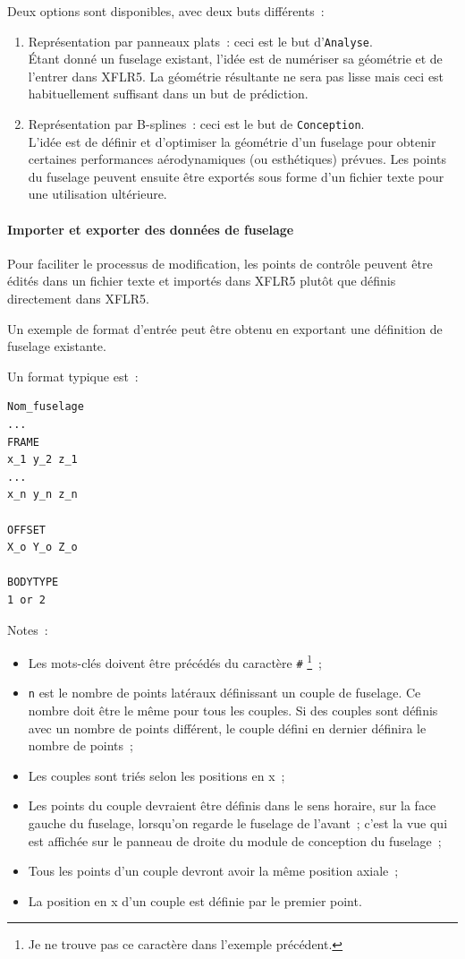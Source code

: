 \documentclass[a4paper,twoside,12pt,dvips]{article}
\begin{document}
Deux options sont disponibles, avec deux buts différents~:

\begin{enumerate}
  \item Représentation par panneaux plats~: ceci est le but 
  d’\texttt{Analyse}.\\
  Étant donné un fuselage existant, l’idée est de numériser sa géométrie et de
  l’entrer dans XFLR5. La géométrie résultante ne sera pas lisse mais ceci est
  habituellement suffisant dans un but de prédiction. 
  \item Représentation par B-splines~: ceci est le but de \texttt{Conception}.\\
  L’idée est de définir et d’optimiser la géométrie d’un fuselage pour
  obtenir certaines performances aérodynamiques (ou esthétiques) prévues. Les 
  points du fuselage peuvent ensuite être exportés sous forme d’un fichier texte
  pour une utilisation ultérieure.
\end{enumerate}

\paragraph{Importer et exporter des données de fuselage} 
Pour faciliter le processus de modification, les points de contrôle peuvent être 
édités dans un fichier texte et importés dans XFLR5 plutôt que définis directement dans XFLR5. 

Un exemple de format d’entrée peut être obtenu en exportant une définition 
de fuselage existante.

Un format typique est~: 

\begin{verbatim}
Nom_fuselage
...
FRAME
x_1 y_2 z_1
...
x_n y_n z_n

OFFSET
X_o Y_o Z_o

BODYTYPE
1 or 2
\end{verbatim}

Notes~:
\begin{itemize}
	\item Les mots-clés doivent être précédés du caractère \texttt{\#}
	\footnote{Je ne trouve pas ce caractère dans l’exemple précédent.}~;
	\item \texttt{n} est le nombre de points latéraux définissant un couple de
	fuselage. Ce nombre doit être le même pour tous les couples. Si des couples
	sont définis avec un nombre de points différent, le couple défini en dernier
	définira le nombre de points~;
	\item Les couples sont triés selon les positions en x~;
	\item Les points du couple devraient être définis dans le sens horaire, sur 
	la face gauche du fuselage, lorsqu’on regarde le fuselage de l’avant~; c’est 
	la vue qui est affichée sur le panneau de droite du module de conception du 
	fuselage~;
	\item Tous les points d’un couple devront avoir la même position axiale~;
	\item La position en x d’un couple est définie par le premier point.
\end{itemize}
\end{document}
